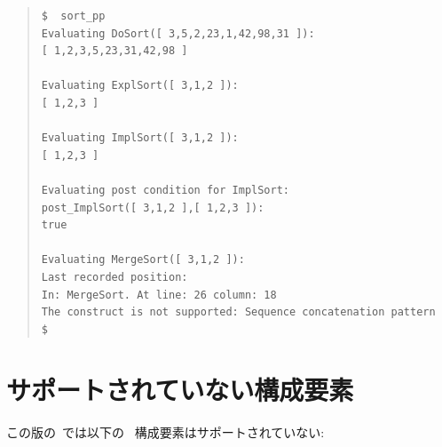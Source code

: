 \documentclass[\pformat,12pt]{jarticle}
\begin{document}
\begin{quote}
\begin{verbatim}
$  sort_pp
Evaluating DoSort([ 3,5,2,23,1,42,98,31 ]):
[ 1,2,3,5,23,31,42,98 ]

Evaluating ExplSort([ 3,1,2 ]):
[ 1,2,3 ]

Evaluating ImplSort([ 3,1,2 ]):
[ 1,2,3 ]

Evaluating post condition for ImplSort:
post_ImplSort([ 3,1,2 ],[ 1,2,3 ]):
true

Evaluating MergeSort([ 3,1,2 ]):
Last recorded position:
In: MergeSort. At line: 26 column: 18
The construct is not supported: Sequence concatenation pattern
$
\end{verbatim}
\end{quote}


\section{サポートされていない構成要素}\label{sec:unsupported}

 この版の\tcg\ では以下の \VDM\ 構成要素はサポートされていない:
\end{document}
